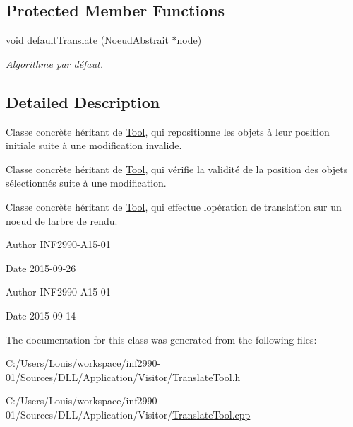\subsection*{Protected Member Functions}
\begin{DoxyCompactItemize}
\item 
void \hyperlink{group__inf2990_ga1e47597de16ebba1986441232607d6dc}{default\+Translate} (\hyperlink{class_noeud_abstrait}{Noeud\+Abstrait} $\ast$node)
\begin{DoxyCompactList}\small\item\em Algorithme par défaut. \end{DoxyCompactList}\end{DoxyCompactItemize}


\subsection{Detailed Description}
Classe concrète héritant de \hyperlink{class_tool}{Tool}, qui repositionne les objets à leur position initiale suite à une modification invalide. 

Classe concrète héritant de \hyperlink{class_tool}{Tool}, qui vérifie la validité de la position des objets sélectionnés suite à une modification.

Classe concrète héritant de \hyperlink{class_tool}{Tool}, qui effectue l\textquotesingle{}opération de translation sur un noeud de l\textquotesingle{}arbre de rendu.

\begin{DoxyAuthor}{Author}
I\+N\+F2990-\/\+A15-\/01 
\end{DoxyAuthor}
\begin{DoxyDate}{Date}
2015-\/09-\/26
\end{DoxyDate}
\begin{DoxyAuthor}{Author}
I\+N\+F2990-\/\+A15-\/01 
\end{DoxyAuthor}
\begin{DoxyDate}{Date}
2015-\/09-\/14 
\end{DoxyDate}


The documentation for this class was generated from the following files\+:\begin{DoxyCompactItemize}
\item 
C\+:/\+Users/\+Louis/workspace/inf2990-\/01/\+Sources/\+D\+L\+L/\+Application/\+Visitor/\hyperlink{_translate_tool_8h}{Translate\+Tool.\+h}\item 
C\+:/\+Users/\+Louis/workspace/inf2990-\/01/\+Sources/\+D\+L\+L/\+Application/\+Visitor/\hyperlink{_translate_tool_8cpp}{Translate\+Tool.\+cpp}\end{DoxyCompactItemize}
